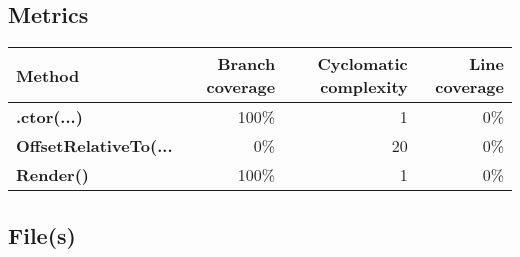 \documentclass[a4paper,landscape,10pt]{article}
\begin{document}
\subsection{Metrics}
\begin{longtable}[l]{|l|r|r|r|}
\hline
\textbf{Method} & \textbf{Branch coverage} & \textbf{Cyclomatic complexity} & \textbf{Line coverage}\\
\hline
\textbf{.ctor(...)} & 100\% & 1 & 0\%\\
\hline
\textbf{OffsetRelativeTo(...} & 0\% & 20 & 0\%\\
\hline
\textbf{Render()} & 100\% & 1 & 0\%\\
\hline
\end{longtable}
\subsection{File(s)}
\end{document}
